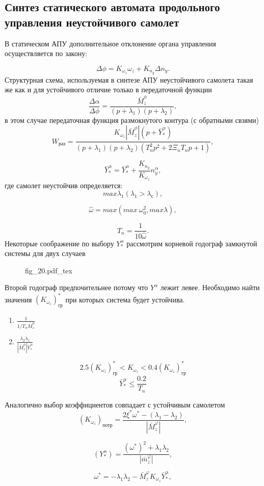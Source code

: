 \documentclass{article}
\begin{document}
\subsection{Синтез статического автомата продольного управления неустойчивого самолет}
В статическом АПУ дополнительное отклонение органа управления осуществляется по закону: 

\[
\Delta \phi = K_{\omega_{z}} \omega_z + K_{n_y} \Delta n_y.
\]
Структурная схема, используемая в синтезе АПУ неустойчивого самолета такая же как и для устойчивого отличие только в передаточной функции 
\[
{\frac{\Delta \alpha}{\Delta \phi} } = \frac{\bar{M}_z^\phi}{(p+\lambda_1)(p+\lambda_2)},
\]
в этом случае передаточная функция размокнутого контура (с обратными свзями)
\[
W_{раз} = \frac{K_{\omega_z} |\bar{M}_z^\phi |(p + \bar{Y}^\alpha_*) }{(p+\lambda_1)(p+\lambda_2)(T_n^2 p^2 + 2 \Xi_n T_n p +1)},
\]

\[
\bar{Y}_*^\alpha = \bar{Y}_*^\alpha + \frac{K_{n_y}}{K_{\omega_z}} n_y^\alpha,
\]
где самолет неустойчив определяется: 
\[
max \lambda_1 (\lambda_1 > \lambda_с),
\]

\[
\hat{\omega} = max(max \: \omega_0^2, max \lambda),
\]

\[
T_n = \frac{1}{10 \hat{\omega}}.
\]
Некоторые соображение по выбору $Y_*^\alpha$ рассмотрим корневой годограф замкнутой системы для двух случаев 
\begin{figure}[h]
\centering
{fig_20.pdf_tex}
\end{figure}

Второй годограф предпочительнее потому что $Y^\alpha$ лежит левее.
Необходимо найти значения $(K_{\omega_z})_{гр}^*$ при которых система будет устойчива.
\begin{enumerate}
\item $\frac{1}{1/T_n \bar{M}_z^\phi}$
\item $\frac{\lambda_2 \lambda_1}{| \bar{M}_z^\phi|\bar{Y}_*^\alpha}$
\end{enumerate}
\[
2.5 (K_{\omega_z})^*_{гр} < K_{\omega_z} < 0.4(K_{\omega_z})^*_{гр}  
\]
\[
\bar{Y}_*^\alpha \le \frac{0.2}{T_n}
\]

Аналогично выбор коэффициентов совпадает с устойчивым самолетом 
\[
(K_{\omega_z})_{потр} = \frac{2 \xi^* \omega^* - (\lambda_1 - \lambda_2)}{|\bar{M}_z^\varphi|},
\]

\[
(Y_*^\alpha) = \frac{(\omega^*)^2 + \lambda_1 \lambda_2}{|\bar{m}_z^\varphi|},
\]

\[
\omega^* =  - \lambda_1 \lambda_2 - \bar{M}_z^\varphi K_{\omega_z} \bar{Y}_*^\alpha, 
\]
\end{document}
